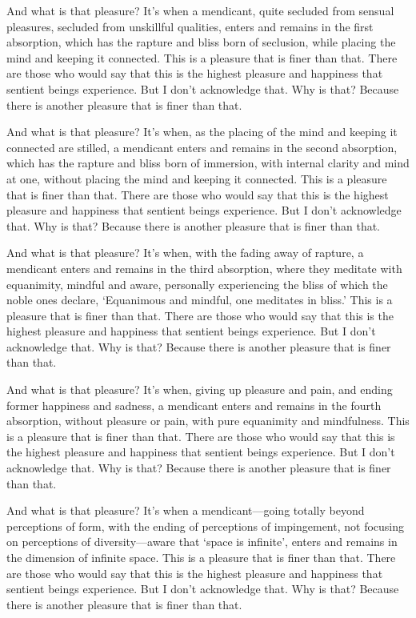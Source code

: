 \documentclass[12pt,openany]{book}%
\begin{document}
And what is that pleasure? It’s when a mendicant, quite secluded from sensual pleasures, secluded from unskillful qualities, enters and remains in the first absorption, which has the rapture and bliss born of seclusion, while placing the mind and keeping it connected. This is a pleasure that is finer than that. There are those who would say that this is the highest pleasure and happiness that sentient beings experience. But I don’t acknowledge that. Why is that? Because there is another pleasure that is finer than that. 

And what is that pleasure? It’s when, as the placing of the mind and keeping it connected are stilled, a mendicant enters and remains in the second absorption, which has the rapture and bliss born of immersion, with internal clarity and mind at one, without placing the mind and keeping it connected. This is a pleasure that is finer than that. There are those who would say that this is the highest pleasure and happiness that sentient beings experience. But I don’t acknowledge that. Why is that? Because there is another pleasure that is finer than that. 

And what is that pleasure? It’s when, with the fading away of rapture, a mendicant enters and remains in the third absorption, where they meditate with equanimity, mindful and aware, personally experiencing the bliss of which the noble ones declare, ‘Equanimous and mindful, one meditates in bliss.’ This is a pleasure that is finer than that. There are those who would say that this is the highest pleasure and happiness that sentient beings experience. But I don’t acknowledge that. Why is that? Because there is another pleasure that is finer than that. 

And what is that pleasure? It’s when, giving up pleasure and pain, and ending former happiness and sadness, a mendicant enters and remains in the fourth absorption, without pleasure or pain, with pure equanimity and mindfulness. This is a pleasure that is finer than that. There are those who would say that this is the highest pleasure and happiness that sentient beings experience. But I don’t acknowledge that. Why is that? Because there is another pleasure that is finer than that. 

And what is that pleasure? It’s when a mendicant—going totally beyond perceptions of form, with the ending of perceptions of impingement, not focusing on perceptions of diversity—aware that ‘space is infinite’, enters and remains in the dimension of infinite space. This is a pleasure that is finer than that. There are those who would say that this is the highest pleasure and happiness that sentient beings experience. But I don’t acknowledge that. Why is that? Because there is another pleasure that is finer than that. 
\end{document}
